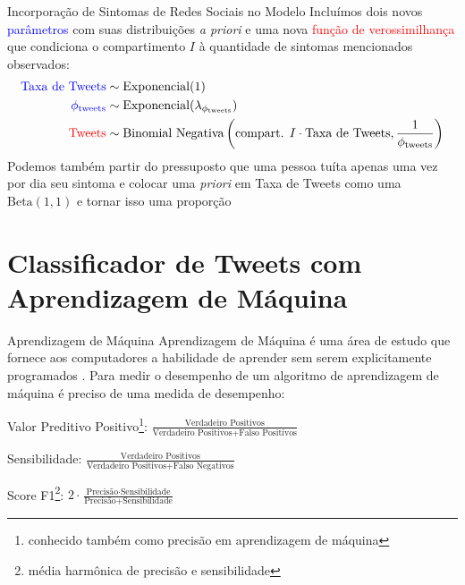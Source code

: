 \documentclass[aspectratio=169]{beamer}                    %
\begin{document}
\begin{frame}{Incorporação de Sintomas de Redes Sociais no Modelo}
    Incluímos dois novos \textcolor{blue}{parâmetros} com suas distribuições \textit{a priori} e uma nova \textcolor{red}{função de verossimilhança} que condiciona o compartimento $I$ à quantidade de sintomas mencionados observados:
    \begin{align*}
        \textcolor{blue}{\text{Taxa de Tweets}} &\sim \text{Exponencial}(1) \\
        \textcolor{blue}{\phi_{\text{tweets}}} &\sim \text{Exponencial}(\lambda_{\phi_{\text{tweets}}}) \\
        \textcolor{red}{\text{Tweets}} &\sim \text{Binomial Negativa}\left(\text{compart. $I$} \cdot \text{Taxa de Tweets}, \frac{1}{\phi_{\text{tweets}}}\right)
    \end{align*}
    Podemos também partir do pressuposto que uma pessoa tuíta apenas uma vez por dia seu sintoma e colocar uma \textit{priori} em Taxa de Tweets como uma $\text{Beta}(1, 1)$ e tornar isso uma proporção
\end{frame}

\section{Classificador de Tweets com Aprendizagem de Máquina}
\begin{frame}{Aprendizagem de Máquina}
    Aprendizagem de Máquina é uma área de estudo que fornece aos computadores a habilidade de aprender sem serem explicitamente programados \parencite{mitchell1997machine}.
    \vfill
    Para medir o desempenho de um algoritmo de aprendizagem de máquina é preciso de uma medida de desempenho:
    \begin{vfilleditems}
        \item Valor Preditivo Positivo\footnote{conhecido também como precisão em aprendizagem de máquina}: $\frac{\text{Verdadeiro Positivos}}{\text{Verdadeiro Positivos} + \text{Falso Positivos}}$
        \item Sensibilidade: $\frac{\text{Verdadeiro Positivos}}{\text{Verdadeiro Positivos} + \text{Falso Negativos}}$
        \item Score F1\footnote{média harmônica de precisão e sensibilidade}: $2 \cdot \frac{\text{Precisão} \cdot \text{Sensibilidade}}{\text{Precisão} + \text{Sensibilidade}}$
    \end{vfilleditems}
\end{frame}
\end{document}
